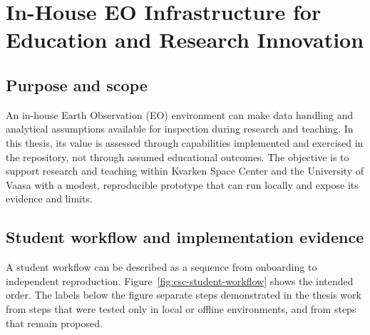 \chapter{In-House EO Infrastructure for Education and Research Innovation}

\section{Purpose and scope}

An in-house Earth Observation (EO) environment can make data handling and analytical
assumptions available for inspection during research and teaching. In this thesis, its
value is assessed through capabilities implemented and exercised in the repository, not
through assumed educational outcomes. The objective is to support research and teaching
within Kvarken Space Center and the University of Vaasa with a modest, reproducible
prototype that can run locally and expose its evidence and limits.

\section{Student workflow and implementation evidence}

A student workflow can be described as a sequence from onboarding to independent
reproduction. Figure~\ref{fig:csc-student-workflow} shows the intended order. The labels
below the figure separate steps demonstrated in the thesis work from steps that were
tested only in local or offline environments, and from steps that remain proposed.


